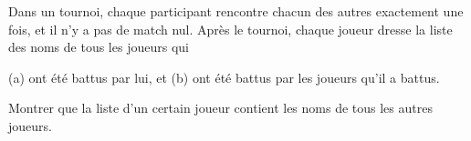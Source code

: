 Dans un tournoi, chaque participant rencontre chacun des autres exactement une fois, et il n'y a pas de match nul. Après le tournoi, chaque joueur dresse la liste des noms de tous les joueurs qui

(a) ont été battus par lui, et (b) ont été battus par les joueurs qu'il a battus.

Montrer que la liste d'un certain joueur contient les noms de tous les autres joueurs.
